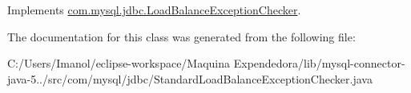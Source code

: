 Implements \mbox{\hyperlink{interfacecom_1_1mysql_1_1jdbc_1_1_load_balance_exception_checker_afe38ee5813abd27e1fb61d8adab72f64}{com.\+mysql.\+jdbc.\+Load\+Balance\+Exception\+Checker}}.



The documentation for this class was generated from the following file\+:\begin{DoxyCompactItemize}
\item 
C\+:/\+Users/\+Imanol/eclipse-\/workspace/\+Maquina Expendedora/lib/mysql-\/connector-\/java-\/5../src/com/mysql/jdbc/Standard\+Load\+Balance\+Exception\+Checker.\+java\end{DoxyCompactItemize}
